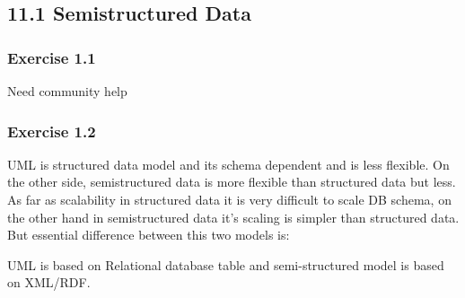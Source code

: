 \documentclass[../../main.tex]{subfiles}
\begin{document}
\subsection{11.1 Semistructured Data}

\subsubsection*{Exercise 1.1}

Need community help

\subsubsection*{Exercise 1.2}

UML is structured data model and its schema dependent and is less flexible. On the other side,
semistructured data is more flexible than structured data but less. As far as scalability
in structured data it is very difficult to scale DB schema, on the other hand in
semistructured data it's scaling is simpler than structured data. But
essential difference between this two models is:

UML is based on Relational database table and semi-structured model is based on XML/RDF.
\end{document}
